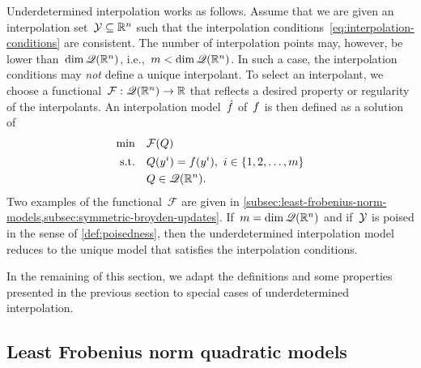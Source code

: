 Underdetermined interpolation works as follows.
Assume that we are given an interpolation set~$\xpt \subseteq \R^n$ such that the interpolation conditions~\cref{eq:interpolation-conditions} are consistent.
The number of interpolation points may, however, be lower than~$\dim \mathscr{Q}(\mathbb{R}^n)$, i.e.,~$m < \dim \mathscr{Q}(\mathbb{R}^n)$.
In such a case, the interpolation conditions may \emph{not} define a unique interpolant.
To select an interpolant, we choose a functional~$\mathcal{F} : \mathscr{Q}(\mathbb{R}^n) \to \mathbb{R}$ that reflects a desired property or regularity of the interpolants.
An interpolation model~$\objm$ of~$f$ is then defined as a solution of
\begin{subequations}
    \label{eq:underdetermined-models}
    \begin{align}
        \min        & \quad \mathcal{F}(Q)\\
        \text{s.t.} & \quad Q(y^i) = f(y^i), ~ i \in \{1, 2, \dots, m\}\\
                    & \quad Q \in \mathscr{Q}(\mathbb{R}^n). \nonumber
    \end{align}
\end{subequations}
Two examples of the functional~$\mathcal{F}$ are given in \cref{subsec:least-frobenius-norm-models,subsec:symmetric-broyden-updates}.
If~$m = \dim \mathscr{Q}(\mathbb{R}^n)$ and if~$\xpt$ is poised in the sense of \cref{def:poisedness}, then the underdetermined interpolation model reduces to the unique model that satisfies the interpolation conditions.

In the remaining of this section, we adapt the definitions and some properties presented in the previous section to special cases of underdetermined interpolation.

\subsection{Least Frobenius norm quadratic models}
\label{subsec:least-frobenius-norm-models}

